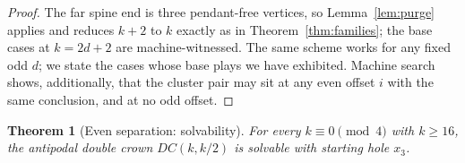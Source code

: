 \documentclass[11pt]{article}
\newtheorem{theorem}{Theorem}[section]
\theoremstyle{definition}
\begin{document}
\begin{proof}
The far spine end is three pendant-free vertices, so
Lemma~\ref{lem:purge} applies and reduces $k+2$ to $k$ exactly as in
Theorem~\ref{thm:families}; the base cases at $k=2d+2$ are
machine-witnessed. The same scheme works for any fixed odd $d$; we
state the cases whose base plays we have exhibited. Machine search
shows, additionally, that the cluster pair may sit at any even
offset $i$ with the same conclusion, and at no odd offset.
\end{proof}

\begin{theorem}[Even separation: solvability]\label{thm:dcs}
For every $k\equiv 0\pmod 4$ with $k\ge 16$, the antipodal double
crown $DC(k,k/2)$ is solvable with starting hole $x_3$.
\end{theorem}
\end{document}
